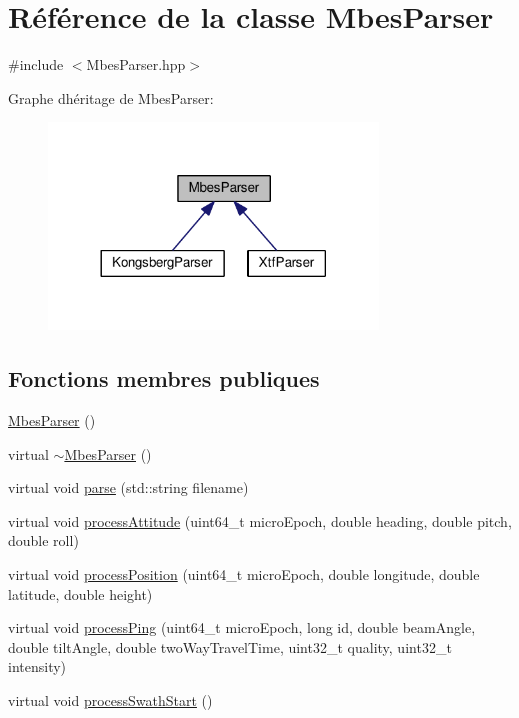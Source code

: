 \hypertarget{classMbesParser}{}\section{Référence de la classe Mbes\+Parser}
\label{classMbesParser}


{\ttfamily \#include $<$Mbes\+Parser.\+hpp$>$}



Graphe d\textquotesingle{}héritage de Mbes\+Parser\+:
\nopagebreak
\begin{figure}[H]
\begin{center}
\leavevmode
\includegraphics[width=248pt]{classMbesParser__inherit__graph}
\end{center}
\end{figure}
\subsection*{Fonctions membres publiques}
\begin{DoxyCompactItemize}
\item 
\hyperlink{classMbesParser_ac6ef7327a407484a528c0b1c0384db9f}{Mbes\+Parser} ()
\item 
virtual \hyperlink{classMbesParser_aa72a4049542622ecebba6aec01a1e763}{$\sim$\+Mbes\+Parser} ()
\item 
virtual void \hyperlink{classMbesParser_a10e172520c1ca2b87dab51aef9e57c2a}{parse} (std\+::string filename)
\item 
virtual void \hyperlink{classMbesParser_a347e78a8a1369c1ea6e63e7eea474b31}{process\+Attitude} (uint64\+\_\+t micro\+Epoch, double heading, double pitch, double roll)
\item 
virtual void \hyperlink{classMbesParser_add86a02726482d3a8e2a8aaf7f4beefa}{process\+Position} (uint64\+\_\+t micro\+Epoch, double longitude, double latitude, double height)
\item 
virtual void \hyperlink{classMbesParser_a9c099ea1003fff3c99991c37da1d40a6}{process\+Ping} (uint64\+\_\+t micro\+Epoch, long id, double beam\+Angle, double tilt\+Angle, double two\+Way\+Travel\+Time, uint32\+\_\+t quality, uint32\+\_\+t intensity)
\item 
virtual void \hyperlink{classMbesParser_ab6481abeb95b37b435a3bf2d705eba19}{process\+Swath\+Start} ()
\end{DoxyCompactItemize}



